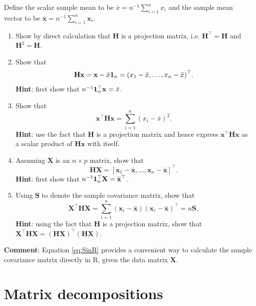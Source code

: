 \documentclass[]{book}
\theoremstyle{definition}
\theoremstyle{definition}
\theoremstyle{definition}
\theoremstyle{remark}
\begin{document}
\begin{enumerate}
  Define the scalar sample mean to be \(\bar{x}=n^{-1}\sum_{i=1}^n x_i\) and the sample mean vector to be \(\bar{\mathbf x}=n^{-1} \sum_{i=1}^n \mathbf x_i\).

  \begin{enumerate}
  \def\labelenumii{\roman{enumii}.}
  \item
    Show by direct calculation that \(\mathbf H\) is a projection matrix, i.e. \(\mathbf H^\top = \mathbf H\) and \(\mathbf H^2 =\mathbf H\).
  \item
    Show that
    \[
      \mathbf H\mathbf x= \mathbf x- \bar{x}{\bf 1}_n = (  x_1 - \bar{x}, \ldots , x_n -\bar{x})^\top.
      \]
    \textbf{Hint}: first show that \(n^{-1}{\bf 1}_n^\top \mathbf x=\bar{x}\).
  \item
    Show that
    \[
      \mathbf x^\top \mathbf H\mathbf x= \sum_{i=1}^n (x_i-\bar{x})^2.
      \]
    \textbf{Hint}: use the fact that \(\mathbf H\) is a projection matrix and hence express \(\mathbf x^\top \mathbf H\mathbf x\) as a scalar product of \(\mathbf H\mathbf x\) with itself.
  \item
    Assuming \(\mathbf X\) is an \(n \times p\) matrix, show that
    \[
      \mathbf H\mathbf X=[\mathbf x_1 - \bar{\mathbf x}, \ldots , \mathbf x_n -\bar{\mathbf x}]^\top.
      \]
    \textbf{Hint}: first show that \(n^{-1} {\bf 1}_n^\top \mathbf X=\bar{\mathbf x}^\top\).
  \item
    Using \(\mathbf S\) to denote the sample covariance matrix, show that
    \begin{equation}
      \mathbf X^\top \mathbf H\mathbf X= \sum_{i=1}^n (\mathbf x_i -\bar{\mathbf x})(\mathbf x_i -\bar{\mathbf x})^\top = n\mathbf S,
       \label{eq:SinR}
      \end{equation}
    \textbf{Hint}: using the fact that \(\mathbf H\) is a projection matrix,
    show that
    \(\mathbf X^\top \mathbf H\mathbf X=(\mathbf H\mathbf X)^\top (\mathbf H\mathbf X)\).
  \end{enumerate}

  \textbf{Comment}: Equation \eqref{eq:SinR} provides a convenient way to calculate the sample covariance matrix directly in R, given the data matrix \(\mathbf X\).
\end{enumerate}

\hypertarget{linalg-decomp}{%
\chapter{Matrix decompositions}\label{linalg-decomp}}
\end{document}
